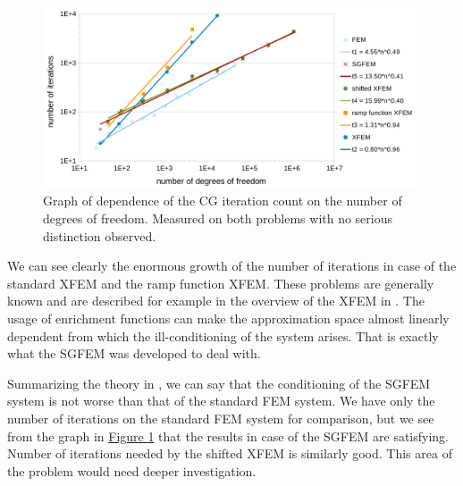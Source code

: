 \documentclass{elsarticle}
\newcommand{\fig}[1]{\hyperref[#1]{Figure \ref{#1}}}
\begin{document}
\begin{figure}[!htb]
  \centering    
  \includegraphics[width=\textwidth]{results/iterations.pdf}
  \caption[Iterations graph]{Graph of dependence of the CG iteration count on the 
  number of degrees of freedom. Measured on both problems with no serious distinction observed.}
  \label{fig:iterations}
\end{figure}
%
We can see clearly the enormous growth of the number of iterations in case of the standard XFEM and the ramp 
function XFEM. These problems are generally known and are described for example in the overview of the XFEM in
\cite{fries_xfem_overview_2010}. The usage of enrichment functions can make the approximation space almost linearly 
dependent from which the ill-conditioning of the system arises. That is exactly what the SGFEM was developed to deal with.

Summarizing the theory in \cite{babuska_stable_2012}, we can say that the conditioning of the SGFEM system is not worse than that of the 
standard FEM system. We have only the number of iterations on the standard FEM system for comparison, 
but we see from the graph in \fig{fig:iterations} that the results in case of the SGFEM are satisfying.
Number of iterations needed by the shifted XFEM is similarly good. This area of the problem would need deeper 
investigation.
\end{document}
